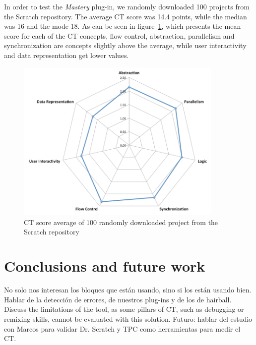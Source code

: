 \documentclass[a4paper,11pt]{article}
\begin{document}
In order to test the \textit{Mastery} plug-in, we randomly downloaded 100 projects from the Scratch repository. The average CT score was 14.4 points, while the median was 16 and the mode 18. As can be seen in figure~\ref{fig:scores}, which presents the mean score for each of the CT concepts, flow control, abstraction, parallelism and synchronization are concepts slightly above the average, while user interactivity and data representation get lower values.
\begin{figure}
  \centering
    \includegraphics[width=10cm]{img/spider.png}
    \caption{CT score average of 100 randomly downloaded project from the Scratch repository}
    \label{fig:scores}
\end{figure}

\section{Conclusions and future work}
\label{sec:conclusions}
No solo nos interesan los bloques que están usando, sino si los están usando bien. Hablar de la detección de errores, de nuestros plug-ins y de los de hairball.
Discuss the limitations of the tool, as some pillars of CT, such as debugging or remixing skills, cannot be evaluated with this solution.
Futuro: hablar del estudio con Marcos para validar Dr. Scratch y TPC como herramientas para medir el CT.
\newpage


\end{document}
